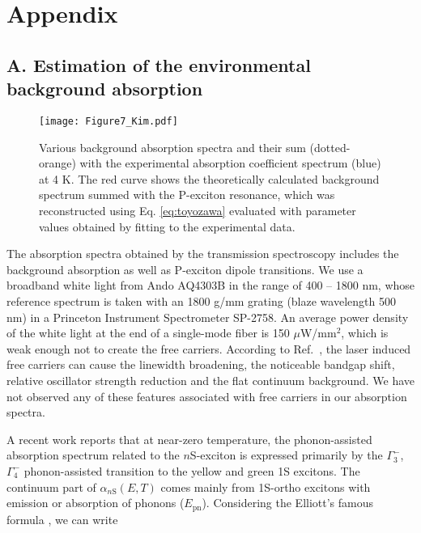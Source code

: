 \documentclass[aps,reprint,amsmath,amssymb,prb]{revtex4-1}
\begin{document}
\clearpage
\section*{Appendix}

\subsection*{A. Estimation of the environmental background absorption}

\begin{figure}[htbp]
\centering
\texttt{[image: Figure7\_Kim.pdf]}
\caption{Various background absorption spectra and their sum (dotted-orange) with the experimental absorption coefficient spectrum (blue) at 4 K. The red curve shows the theoretically calculated background spectrum summed with the P-exciton resonance, which was reconstructed using Eq. \ref{eq:toyozawa} evaluated with parameter values obtained by fitting to the experimental data.}
\label{Fig7:absco}
\end{figure}

The absorption spectra obtained by the transmission spectroscopy includes the background absorption as well as P-exciton dipole transitions. We use a broadband white light from Ando AQ4303B in the range of 400 – 1800 nm, whose reference spectrum is taken with an 1800 g/mm grating (blaze wavelength 500 nm) in a Princeton Instrument Spectrometer SP-2758. An average power density of the white light at the end of a single-mode fiber is 150 $\mu$W/mm$^2$, which is weak enough not to create the free carriers. According to Ref.~\cite{Heckoetter2018}, the laser induced free carriers can cause the linewidth broadening, the noticeable bandgap shift, relative oscillator strength reduction and the flat continuum background. We have not observed any of these features associated with free carriers in our absorption spectra. 

A recent work \cite{Schone2017} reports that at near-zero temperature, the phonon-assisted absorption spectrum related to the $n$S-exciton is expressed primarily by the ${\Gamma}_3^{-}$, ${\Gamma}_4^{-}$  phonon-assisted transition to the yellow and green 1S excitons. The continuum part of $\alpha_{n\text{S}} (E, T)$ comes mainly from 1S-ortho excitons with emission or absorption of phonons ($E_\text{pn}$). Considering the Elliott's famous formula \cite{Elliott1957, Grun1961}, we can write
\end{document}
